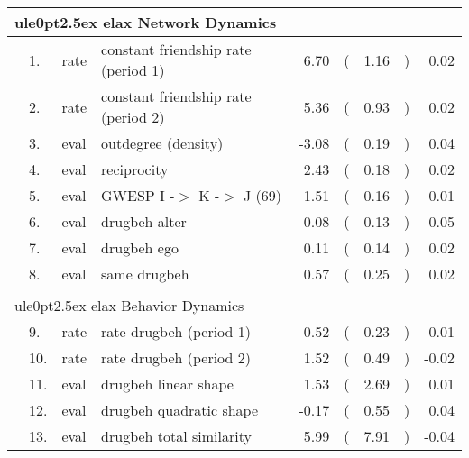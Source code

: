 \begin{table}[ht]
\centering
\begin{tabular}{llllrlrlr}
  \hline
  \multicolumn{4}{l}{
ule{0pt}{2.5ex}
elax  Network Dynamics } \\ 
 \hline
  &  1. & rate & constant friendship rate (period 1) & 6.70 & ( & 1.16 & ) & 0.02 \\ 
    &  2. & rate & constant friendship rate (period 2) & 5.36 & ( & 0.93 & ) & 0.02 \\ 
    &  3. & eval & outdegree (density) & -3.08 & ( & 0.19 & ) & 0.04 \\ 
    &  4. & eval & reciprocity & 2.43 & ( & 0.18 & ) & 0.02 \\ 
    &  5. & eval & GWESP I -$>$ K -$>$ J (69) & 1.51 & ( & 0.16 & ) & 0.01 \\ 
    &  6. & eval & drugbeh alter & 0.08 & ( & 0.13 & ) & 0.05 \\ 
    &  7. & eval & drugbeh ego & 0.11 & ( & 0.14 & ) & 0.02 \\ 
    &  8. & eval & same drugbeh & 0.57 & ( & 0.25 & ) & 0.02 \\ 
   \\  \multicolumn{4}{l}{
ule{0pt}{2.5ex}
elax  Behavior Dynamics } \\ 
  &  9. & rate & rate drugbeh (period 1) & 0.52 & ( & 0.23 & ) & 0.01 \\ 
    & 10. & rate & rate drugbeh (period 2) & 1.52 & ( & 0.49 & ) & -0.02 \\ 
    & 11. & eval & drugbeh linear shape & 1.53 & ( & 2.69 & ) & 0.01 \\ 
    & 12. & eval & drugbeh quadratic shape & -0.17 & ( & 0.55 & ) & 0.04 \\ 
    & 13. & eval & drugbeh total similarity & 5.99 & ( & 7.91 & ) & -0.04 \\ 
   \hline
\end{tabular}
\end{table}
